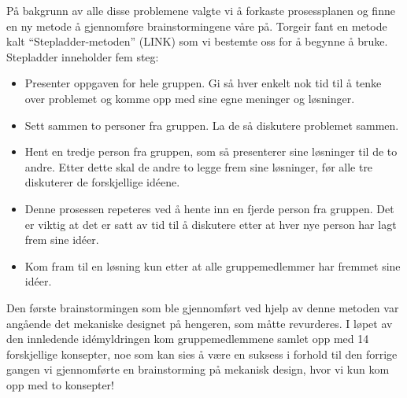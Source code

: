 På bakgrunn av alle disse problemene valgte vi å forkaste prosessplanen og finne en ny metode å gjennomføre brainstormingene våre på. Torgeir fant en metode kalt “Stepladder-metoden” (LINK) som vi bestemte oss for å begynne å bruke. Stepladder inneholder fem steg: 
\begin{itemize}
\item Presenter oppgaven for hele gruppen. Gi så hver enkelt nok tid til å tenke over problemet og komme opp med sine egne meninger og løsninger.

\item Sett sammen to personer fra gruppen. La de så diskutere problemet sammen.

\item Hent en tredje person fra gruppen, som så presenterer sine løsninger til de to andre. Etter dette skal de andre to legge frem sine løsninger, før alle tre diskuterer de forskjellige idéene.

\item Denne prosessen repeteres ved å hente inn en fjerde person fra gruppen. Det er viktig at det er satt av tid til å diskutere etter at hver nye person har lagt frem sine idéer.

\item Kom fram til en løsning kun etter at alle gruppemedlemmer har fremmet sine idéer.
\end{itemize}
Den første brainstormingen som ble gjennomført ved hjelp av denne metoden var angående det mekaniske designet på hengeren, som måtte revurderes. I løpet av den innledende idémyldringen kom gruppemedlemmene samlet opp med 14 forskjellige konsepter, noe som kan sies å være en suksess i forhold til den forrige gangen vi gjennomførte en brainstorming på mekanisk design, hvor vi kun kom opp med to konsepter!

